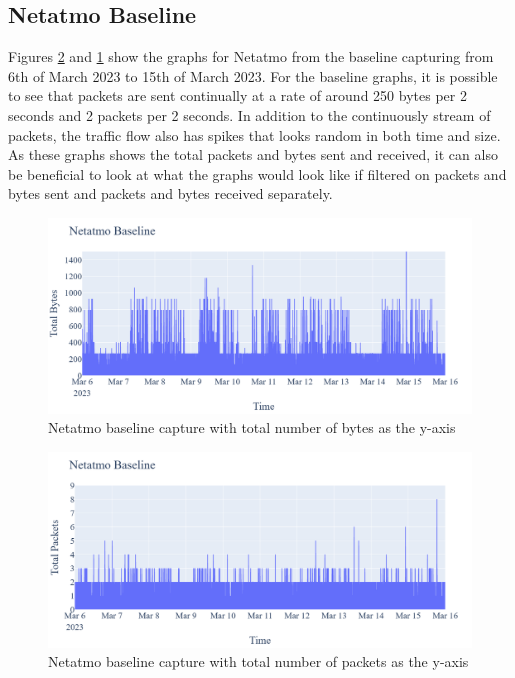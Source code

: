 \subsection{Netatmo Baseline}
Figures \ref{fig:NetatmoBaselineTotalPackets} and \ref{fig:NetatmoBaselineTotalBytes} show the graphs for Netatmo from the baseline capturing from 6th of March 2023 to 15th of March 2023. For the baseline graphs, it is possible to see that packets are sent continually at a rate of around 250 bytes per 2 seconds and 2 packets per 2 seconds. In addition to the continuously stream of packets, the traffic flow also has spikes that looks random in both time and size. As these graphs shows the total packets and bytes sent and received, it can also be beneficial to look at what the graphs would look like if filtered on packets and bytes sent and packets and bytes received separately. 
\begin{figure} [H]
    \centering
    \includegraphics[scale=0.25]{figures/Netatmo_Baseline_TotalBytes.png}
    \caption{Netatmo baseline capture with total number of bytes as the y-axis}
    \label{fig:NetatmoBaselineTotalBytes}
\end{figure}

\begin{figure} [H]    
    \centering
    \includegraphics[scale=0.25]{figures/Netatmo_Baseline_TotalPackets.png}
    \caption{Netatmo baseline capture with total number of packets as the y-axis}
    \label{fig:NetatmoBaselineTotalPackets}
 \end{figure}

